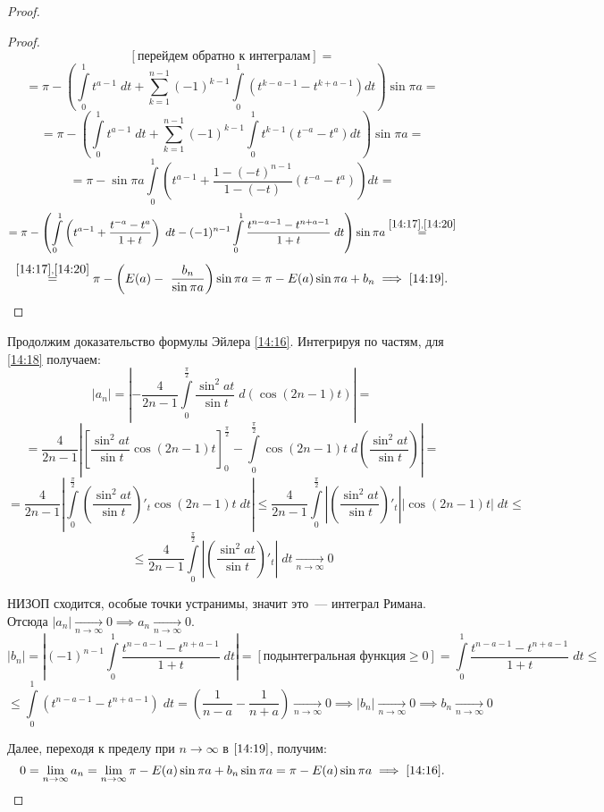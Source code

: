 \documentclass[../../main.tex]{subfiles}
\begin{document}
\begin{proof}
\begin{proof}
\[				[\text{перейдем обратно к интегралам}] = \]
				\[ = \pi - \left( \int\limits_{0}^{1} t^{a-1} \; dt + \sum_{k=1}^{n-1} 
				(-1)^{k-1} \int\limits_{0}^{1} \left( t^{k-a-1} - t^{k+a - 1} \right) dt 
				\right)  \sin{\pi a}  = \]
				\[  =  \pi - \left( \int\limits_{0}^{1} t^{a-1} \; dt + \sum_{k=1}^{n-1} 
				(-1)^{k-1} \int\limits_{0}^{1} t^{k-1} \left( t^{-a} - t^{a} \right) dt 
				\right)  \sin{\pi a} =  \]
				\[  = \pi - \sin{\pi a} \int\limits_{0}^{1} \left( t^{a-1} + 
				\frac{1-(-t)^{n-1}}{1-(-t)}\left( t^{-a} - t^{a} \right) \right) dt  = \]
				\[ = \pi - \left( \int\limits_{0}^{1} \left( t^{a-1} + \frac{t^{-a} - 
				t^a}{1+t} \right) \; dt - (-1)^{n-1} \int\limits_{0}^{1} \frac{t^{n-a-1} - 
				t^{n+a-1}}{1+t} \; dt   \right) \sin{\pi a}  \stackrel{\eqref{14:17}, 
				\eqref{14:20}}= \]
				\[ \stackrel{\eqref{14:17}, \eqref{14:20}}= \pi - \left( E(a) - \
				\frac{b_n}{ \sin{\pi a}} 
				\right) \sin{\pi a} = \pi - E(a) \sin{\pi a} + b_n \implies 
				\eqref{14:19}. 
				\qedhere \]
			\end{proof}	
			
		Продолжим доказательство формулы Эйлера \eqref{14:16}. Интегрируя по 
		частям, для \eqref{14:18} получаем:
		\[  \left| a_n \right|   = \left| -\frac{4}{2n-1}
		\int\limits_{0}^{\frac{\pi}{2}} 
		\frac{\sin^2{at}}{\sin{t}} \; d\left( \cos{(2n-1)t}\right)   \right|  =\]
		\[ = \frac{4}{2n-1} \left| \left[ \frac{\sin^2{at}}{\sin{t}} \cos{(2n-1)t} 
		\right]_{0}^{\frac{\pi}{2}} -\int\limits_{0}^{\frac{\pi}{2}} \cos{(2n-1)t} 
		\; d\left( \frac{\sin^2{at}}{\sin{t}} \right)   \right| =     \]
		\[  = \frac{4}{2n-1}\left| \int\limits_{0}^{\frac{\pi}{2}} \left( 
		\frac{\sin^2{at}}{\sin{t}} \right)'_t \cos{(2n-1)t} \; dt \right|  \le  
		\frac{4}{2n-1} \int\limits_{0}^{\frac{\pi}{2}} \left| \left( 
		\frac{\sin^2{at}}{\sin{t}} \right)'_t \right| \left|\cos{(2n-1)t}\right| \; 
		dt  \le\]
		\[ \le \frac{4}{2n-1} \int\limits_{0}^{\frac{\pi}{2}} \left| \left( 
		\frac{\sin^2{at}}{\sin{t}} \right)'_t \right| \; dt  {\underset{n \to 
		\infty}\rightarrow} 0 \]
		
		НИЗОП сходится, особые точки устранимы, значит это~--- интеграл Римана. 
		Отсюда 
		$\left| a_n \right|{\underset{n \to \infty}\longrightarrow} 0 \implies   a_n 
		{\underset{n \to \infty}\longrightarrow} 0$.
		\[  \left| b_n \right| = \left| (-1)^{n-1} \int\limits_{0}^{1} 
		\frac{t^{n-a-1} - t^{n+a-1}}{1+t} \; dt \right| = \left[
		\text{подынтегральная функция} \ge 0 \right] =  \int\limits_{0}^{1} 
		\frac{t^{n-a-1} - t^{n+a-1}}{1+t} \; dt \le  \]
		\[  \le \int\limits_{0}^{1} (t^{n-a-1} - t^{n+a-1})\; dt = \left(  
		\frac{1}{n-a} - \frac{1}{n+a}\right)  {\underset{n \to 
		\infty}\longrightarrow} 0  \implies  \left| b_n \right| {\underset{n \to 
		\infty}\longrightarrow} 0  \implies   b_n  {\underset{n \to 
		\infty}\longrightarrow} 0  \]
		
		Далее, переходя к пределу при $n \to \infty$ в $\eqref{14:19}$, получим:
		\[ 0 = \lim_{n \to \infty} a_n =  \lim_{n \to \infty} \pi - E(a) \sin{\pi a} 
		+ 
		b_n \sin{\pi a} = \pi - E(a) \sin{\pi a} \implies \eqref{14:16}. \qedhere\]
\end{proof}
\end{document}
